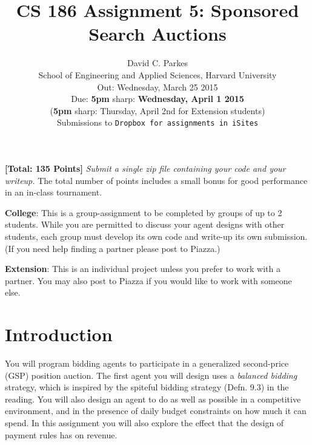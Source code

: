 \documentclass[11pt]{article}
\newcommand{\points}[1]{\textbf{[#1 Points]}}
\begin{document}
\title{CS 186 Assignment 5: Sponsored Search Auctions}
	\author{David C. Parkes  \\
	School of Engineering and Applied Sciences, Harvard University \\
	Out: Wednesday, March 25 2015\\
	Due: {\bf 5pm} sharp: {\bf Wednesday, April 1 2015}
\\({\bf 5pm} sharp: Thursday, April 2nd for Extension students)\\
	Submissions to {\tt Dropbox for assignments in iSites}}
\date{}

\maketitle

\noindent \points{Total: 135} {\em Submit a single zip file containing
  your code and your writeup.} The total number of points includes a
small bonus for good performance in an in-class tournament.

{\bf College}: This is a group-assignment to be completed by groups of
up to 2 students. While you are permitted to discuss your agent
designs with other students, each group must develop its own code and
write-up its own submission. (If you need help finding a partner
please post to Piazza.)


{\bf Extension}: This is an individual project unless you prefer to
work with a partner. You may also post to Piazza if you would like to work with someone else.

\section{Introduction}

You will program bidding agents to participate in a generalized
second-price (GSP) position auction.  The first agent you will design
uses a {\em balanced bidding} strategy, which is inspired by the
spiteful bidding strategy (Defn.  9.3) in the reading.  You will also
design an agent to do as well as possible in a competitive
environment, and in the presence of daily budget constraints on how
much it can spend. In this assignment you will also explore the effect
that the design of payment rules has on revenue.
\end{document}
